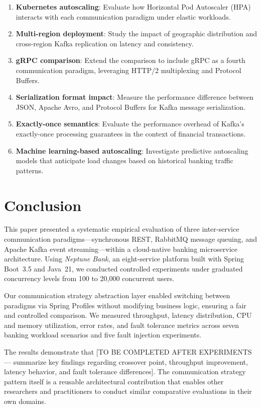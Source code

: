 \documentclass[journal]{IEEEtran}
\begin{document}
\begin{enumerate}
    \item \textbf{Kubernetes autoscaling}: Evaluate how Horizontal Pod Autoscaler (HPA) interacts with each communication paradigm under elastic workloads.
    \item \textbf{Multi-region deployment}: Study the impact of geographic distribution and cross-region Kafka replication on latency and consistency.
    \item \textbf{gRPC comparison}: Extend the comparison to include gRPC as a fourth communication paradigm, leveraging HTTP/2 multiplexing and Protocol Buffers.
    \item \textbf{Serialization format impact}: Measure the performance difference between JSON, Apache Avro, and Protocol Buffers for Kafka message serialization.
    \item \textbf{Exactly-once semantics}: Evaluate the performance overhead of Kafka's exactly-once processing guarantees in the context of financial transactions.
    \item \textbf{Machine learning-based autoscaling}: Investigate predictive autoscaling models that anticipate load changes based on historical banking traffic patterns.
\end{enumerate}


\section{Conclusion}
\label{sec:conclusion}

This paper presented a systematic empirical evaluation of three inter-service communication paradigms---synchronous REST, RabbitMQ message queuing, and Apache Kafka event streaming---within a cloud-native banking microservice architecture. Using \textit{Neptune Bank}, an eight-service platform built with Spring Boot~3.5 and Java~21, we conducted controlled experiments under graduated concurrency levels from 100 to 20,000 concurrent users.

Our communication strategy abstraction layer enabled switching between paradigms via Spring Profiles without modifying business logic, ensuring a fair and controlled comparison. We measured throughput, latency distribution, CPU and memory utilization, error rates, and fault tolerance metrics across seven banking workload scenarios and five fault injection experiments.

The results demonstrate that [TO BE COMPLETED AFTER EXPERIMENTS --- summarize key findings regarding crossover point, throughput improvement, latency behavior, and fault tolerance differences]. The communication strategy pattern itself is a reusable architectural contribution that enables other researchers and practitioners to conduct similar comparative evaluations in their own domains.
\end{document}
